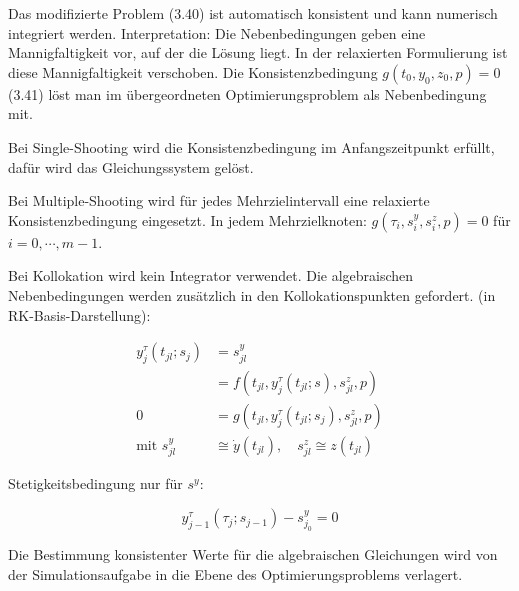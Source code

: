 Das modifizierte Problem (3.40) ist automatisch konsistent und kann numerisch integriert werden. Interpretation: Die Nebenbedingungen geben eine Mannigfaltigkeit vor, auf der die Lösung liegt. In der relaxierten Formulierung ist diese Mannigfaltigkeit verschoben. Die Konsistenzbedingung $g(t_0,y_0,z_0,p) = 0$ (3.41) löst man im übergeordneten Optimierungsproblem als Nebenbedingung mit.

Bei Single-Shooting wird die Konsistenzbedingung im Anfangszeitpunkt erfüllt, dafür wird das Gleichungssystem gelöst.

Bei Multiple-Shooting wird für jedes Mehrzielintervall eine relaxierte Konsistenzbedingung eingesetzt. In jedem Mehrzielknoten: $g(\tau_i, s_i^y, s_i^z, p)=0$ für $i=0,\cdots,m-1$.

Bei Kollokation wird kein Integrator verwendet. Die algebraischen Nebenbedingungen werden zusätzlich in den Kollokationspunkten gefordert. (in RK-Basis-Darstellung):

\begin{align*}
y_j^\tau (t_{jl}; s_j) &= s_{jl}^y \\
&= f(t_{jl}, y_j^\tau(t_{jl};s), s_{jl}^z,p) \\
0 &= g(t_{jl}, y_j^\tau(t_{jl}; s_j), s_{jl}^z, p) \\
\text{mit } s_{jl}^y & \cong \dot y(t_{jl}), \quad s_{jl}^z \cong z(t_{jl})
\end{align*}

Stetigkeitsbedingung nur für $s^y$:

\[ y_{j-1}^\tau (\tau_j; s_{j-1})-s_{j_0}^y = 0 \]

Die Bestimmung konsistenter Werte für die algebraischen Gleichungen wird von der Simulationsaufgabe in die Ebene des Optimierungsproblems verlagert.






